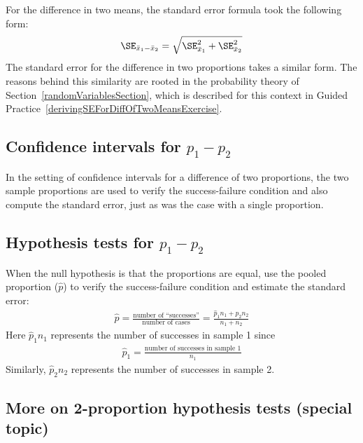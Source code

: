 For the difference in two means, the standard error formula took the following form:
\begin{eqnarray*}
\SE_{\bar{x}_{1} - \bar{x}_{2}} = \sqrt{\SE_{\bar{x}_1}^2 + \SE_{\bar{x}_2}^2}
\end{eqnarray*}
The standard error for the difference in two proportions takes a similar form. The reasons behind this similarity are rooted in the probability theory of Section~\ref{randomVariablesSection}, which is described for this context in Guided Practice~\vref{derivingSEForDiffOfTwoMeansExercise}.


\subsection{Confidence intervals for $p_1 -p_2$}

In the setting of confidence intervals for a difference of two proportions, the two sample proportions are used to verify the success-failure condition and also compute the standard error, just as was the case with a single proportion.



\subsection{Hypothesis tests for $p_1 -p_2$}


\begin{termBox}{
When the null hypothesis is that the proportions are equal, use the pooled proportion ($\hat{p}$) to verify the success-failure condition and estimate the standard error:
\begin{eqnarray*}
\hat{p} = \frac{\text{number of ``successes''}}{\text{number of cases}} = \frac{\hat{p}_1n_1 + \hat{p}_2n_2}{n_1 + n_2}
\end{eqnarray*}
Here $\hat{p}_1n_1$ represents the number of successes in sample 1 since
\begin{eqnarray*}
\hat{p}_1 = \frac{\text{number of successes in sample 1}}{n_1}
\end{eqnarray*}
Similarly, $\hat{p}_2n_2$ represents the number of successes in sample 2.}
\end{termBox}


\subsection{More on 2-proportion hypothesis tests (special topic)}

